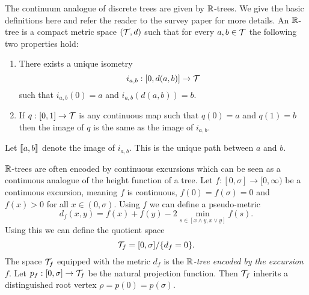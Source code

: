 The continuum analogue of discrete trees are given by ${\mathbb R}$-trees. We give the basic definitions here and refer the reader to the survey paper \cite{legallRandomTreesApplications2005} for more details. An ${\mathbb R}$-tree is a compact metric space $({\mathcal T}, d)$ such that for every $a, b \in {\mathcal T}$ the following two properties hold:
\begin{enumerate}
    \item There exists a unique isometry $$i_{a, b} : [0, d(a, b)] \to {\mathcal T}$$ such that $i_{a, b}(0) = a$ and $i_{a, b}(d(a, b)) = b$.
    \item If $q: [0, 1] \to {\mathcal T}$ is any continuous map such that $q(0) = a$ and $q(1) = b$ then the image of $q$ is the same as the image of $i_{a, b}$.
\end{enumerate}
Let $\llbracket a, b\rrbracket$ denote the image of $i_{a, b}$. This is the unique path between $a$ and $b$.

${\mathbb R}$-trees are often encoded by continuous excursions which can be seen as a continuous analogue of the height function of a tree. Let $f: [0, \sigma] \to [0, \infty)$ be a continuous excursion, meaning $f$ is continuous, $f(0) = f(\sigma) = 0$ and $f(x) > 0$ for all $x \in (0, \sigma)$. Using $f$ we can define a pseudo-metric
\begin{equation*}
    d_f(x, y) = f(x) + f(y) - 2 \min_{s \in [x \wedge y, x \vee y]} f(s).
\end{equation*}
Using this we can define the quotient space
\begin{equation*}
    {\mathcal T}_f = [0, \sigma] / \{d_f = 0\}.
\end{equation*}
The space ${\mathcal T}_f$ equipped with the metric $d_f$ is the \emph{${\mathbb R}$-tree encoded by the excursion $f$}. Let $p_f: [0, \sigma] \to {\mathcal T}_f$ be the natural projection function. Then ${\mathcal T}_f$ inherits a distinguished root vertex $\rho = p(0) = p(\sigma)$.